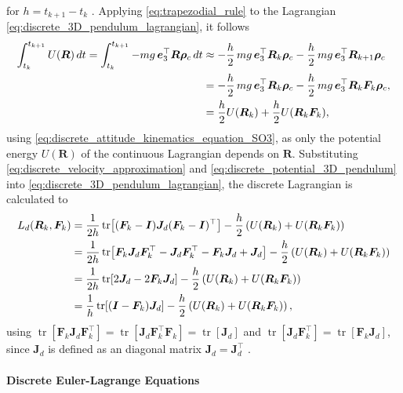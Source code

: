for $h = t_{k+1}-t_k$ \cite{butcher2016numerical}. Applying \eqref{eq:trapezodial_rule} to the Lagrangian \eqref{eq:discrete_3D_pendulum_lagrangian}, it follows
\begin{align}\label{eq:discrete_potential_3D_pendulum}
    \int_{t_k}^{t_{k+1}} U(\bm{R}) \, dt
    =
    \int_{t_k}^{t_{k+1}} -mg\,\bm{e}_3^{\top} \bm{R} \bm{\rho}_c \, dt
    &\approx
    -\frac{h}{2}\, mg\,\bm{e}_3^{\top}  \bm{R}_k \bm{\rho}_c
    -
    \frac{h}{2}\, mg\,\bm{e}_3^{\top} \bm{R}_{k+1} \bm{\rho}_c \notag \\
    &=
    -\frac{h}{2}\, mg\,\bm{e}_3^{\top} \bm{R}_k \bm{\rho}_c
    -
    \frac{h}{2}\, mg\,\bm{e}_3^{\top} \bm{R}_k \bm{F}_k \bm{\rho}_c, \notag \\
    &=\frac{h}{2}U(\bm{R}_k)+\frac{h}{2}U(\bm{R}_k \bm{F}_k),
\end{align}
using \eqref{eq:discrete_attitude_kinematics_equation_SO3}, as only the potential energy $U(\bm{R})$ of the continuous Lagrangian depends on $\bm{R}$. Substituting \eqref{eq:discrete_velocity_approximation} and \eqref{eq:discrete_potential_3D_pendulum} into \eqref{eq:discrete_3D_pendulum_lagrangian}, the discrete Lagrangian is calculated to
\begin{align}
    L_d(\bm{R}_k,\bm{F}_k)
    &=
    \frac{1}{2h}\operatorname{tr}\!\left[(\bm{F}_k-\bm{I})\bm{J}_d(\bm{F}_k-\bm{I})^{\top}\right]
    - \frac{h}{2}\left(U(\bm{R}_k)+U(\bm{R}_k\bm{F}_k)\right)  \notag\\
    &=
    \frac{1}{2h}\operatorname{tr}\!\left[
        \bm{F}_k\bm{J}_d\bm{F}_k^{\top}
        - \bm{J}_d\bm{F}_k^{\top}
        - \bm{F}_k\bm{J}_d
        + \bm{J}_d
    \right]
    - \frac{h}{2}\left(U(\bm{R}_k)+U(\bm{R}_k\bm{F}_k)\right) \notag \\
    &=
    \frac{1}{2h}\operatorname{tr}\!\left[
        2\bm{J}_d - 2\bm{F}_k\bm{J}_d
    \right]
    - \frac{h}{2}\left(U(\bm{R}_k)+U(\bm{R}_k\bm{F}_k)\right) \notag \\
    &=
    \frac{1}{h}\operatorname{tr}\!\left[(\bm{I}-\bm{F}_k)\bm{J}_d\right]
    - \frac{h}{2}\left(U(\bm{R}_k)+U(\bm{R}_k\bm{F}_k)\right),
\end{align}
using $\operatorname{tr}[\bm{F}_k \bm{J}_d \bm{F}_k^\top] = \operatorname{tr}[\bm{J}_d \bm{F}_k^\top \bm{F}_k ] = \operatorname{tr}[\bm{J}_d]$ and $\operatorname{tr}[\bm{J}_d \bm{F}_k^\top] = \operatorname{tr}[\bm{F}_k \bm{J}_d]$, since $\bm{J}_d$ is defined as an diagonal matrix $\bm{J}_d = \bm{J}_d^\top$ \cite{Lee2008}.

\paragraph{Discrete Euler-Lagrange Equations}

